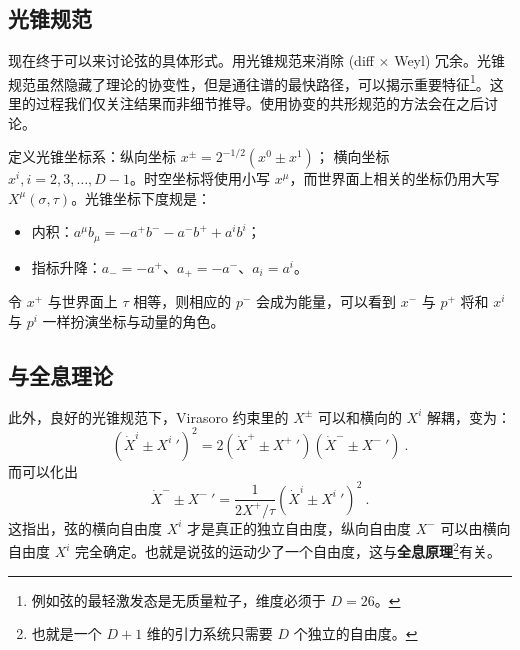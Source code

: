 

\subsection{光锥规范}
现在终于可以来讨论弦的具体形式。用光锥规范来消除 (diff $\times$ Weyl) 冗余。光锥规范虽然隐藏了理论的协变性，但是通往谱的最快路径，可以揭示重要特征\footnote{例如弦的最轻激发态是无质量粒子，维度必须于 $D=26$。}。这里的过程我们仅关注结果而非细节推导。使用协变的共形规范的方法会在之后讨论。

定义光锥坐标系：纵向坐标 $x^{\pm} = 2^{-1/2} (x^0 \pm x^1)$； 横向坐标 $x^i, i = 2, 3, \dots, D-1$。时空坐标将使用小写 $x^\mu$，而世界面上相关的坐标仍用大写 $X^\mu(\sigma, \tau)$。光锥坐标下度规是：
\begin{itemize}
	\item 内积：$a^\mu b_\mu = -a^+ b^- - a^- b^+ + a^i b^i$；
	\item 指标升降：$a_- = -a^+$、$a_+ = -a^-$、$a_i = a^i$。
\end{itemize}

令 $x^+$ 与世界面上 $\tau$ 相等，则相应的 $p^-$ 会成为能量，可以看到 $x^-$ 与 $p^+$ 将和 $x^i$ 与 $p^i$ 一样扮演坐标与动量的角色。

\subsection{与全息理论}
此外，良好的光锥规范下，Virasoro 约束里的 $X^\pm$ 可以和横向的 $X^i$ 解耦，变为：
\begin{equation}
	\left(\dot X^i \pm X^i~'\right)^2 = 2 (\dot X^+ \pm X^+~') (\dot X^- \pm X^-~') ~.
\end{equation}
而可以化出
\begin{equation}
	\dot X^- \pm X^-~' = \frac{1}{2 X^+/\tau} \left(\dot X^i \pm X^i~'\right)^2 ~.
\end{equation}
这指出，弦的横向自由度 $X^i$ 才是真正的独立自由度，纵向自由度 $X^-$ 可以由横向自由度 $X^i$ 完全确定。也就是说弦的运动少了一个自由度，这与\textbf{全息原理}\footnote{也就是一个 $D+1$ 维的引力系统只需要 $D$ 个独立的自由度。}有关。

